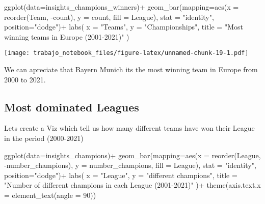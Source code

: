 \documentclass[
]{article}
\newenvironment{Shaded}{\begin{snugshade}}{\end{snugshade}}
\newcommand{\AttributeTok}[1]{\textcolor[rgb]{0.77,0.63,0.00}{#1}}
\newcommand{\DecValTok}[1]{\textcolor[rgb]{0.00,0.00,0.81}{#1}}
\newcommand{\FunctionTok}[1]{\textcolor[rgb]{0.00,0.00,0.00}{#1}}
\newcommand{\NormalTok}[1]{#1}
\newcommand{\SpecialCharTok}[1]{\textcolor[rgb]{0.00,0.00,0.00}{#1}}
\newcommand{\StringTok}[1]{\textcolor[rgb]{0.31,0.60,0.02}{#1}}
\begin{document}
\begin{Shaded}
\begin{Highlighting}[]
\FunctionTok{ggplot}\NormalTok{(}\AttributeTok{data=}\NormalTok{insights\_champions\_winners)}\SpecialCharTok{+}
  \FunctionTok{geom\_bar}\NormalTok{(}\AttributeTok{mapping=}\FunctionTok{aes}\NormalTok{(}\AttributeTok{x =} \FunctionTok{reorder}\NormalTok{(Team, }\SpecialCharTok{{-}}\NormalTok{count), }\AttributeTok{y =}\NormalTok{ count, }\AttributeTok{fill =}\NormalTok{ League), }\AttributeTok{stat =} \StringTok{"identity"}\NormalTok{, }\AttributeTok{position=}\StringTok{"dodge"}\NormalTok{)}\SpecialCharTok{+}
  \FunctionTok{labs}\NormalTok{(}
    \AttributeTok{x =} \StringTok{"Teams"}\NormalTok{,}
    \AttributeTok{y =} \StringTok{"Championships"}\NormalTok{,}
    \AttributeTok{title =} \StringTok{"Most winning teams in Europe (2001{-}2021)"}
\NormalTok{    )}
\end{Highlighting}
\end{Shaded}

\texttt{[image: trabajo\_notebook\_files/figure-latex/unnamed-chunk-19-1.pdf]}

We can apreciate that Bayern Munich its the most winning team in Europe
from 2000 to 2021.

\hypertarget{most-dominated-leagues}{%
\subsection{Most dominated Leagues}\label{most-dominated-leagues}}

Lets create a Viz which tell us how many different teams have won their
League in the period (2000-2021)

\begin{Shaded}
\begin{Highlighting}[]
\FunctionTok{ggplot}\NormalTok{(}\AttributeTok{data=}\NormalTok{insights\_champions)}\SpecialCharTok{+}
  \FunctionTok{geom\_bar}\NormalTok{(}\AttributeTok{mapping=}\FunctionTok{aes}\NormalTok{(}\AttributeTok{x =} \FunctionTok{reorder}\NormalTok{(League, }\SpecialCharTok{{-}}\NormalTok{number\_champions), }\AttributeTok{y =}\NormalTok{ number\_champions, }\AttributeTok{fill =}\NormalTok{ League), }\AttributeTok{stat =} \StringTok{"identity"}\NormalTok{, }\AttributeTok{position=}\StringTok{"dodge"}\NormalTok{)}\SpecialCharTok{+}
  \FunctionTok{labs}\NormalTok{(}
    \AttributeTok{x =} \StringTok{"League"}\NormalTok{,}
    \AttributeTok{y =} \StringTok{"different champions"}\NormalTok{,}
    \AttributeTok{title =} \StringTok{"Number of different champions in each League (2001{-}2021)"}
\NormalTok{  )}\SpecialCharTok{+}
  \FunctionTok{theme}\NormalTok{(}\AttributeTok{axis.text.x =} \FunctionTok{element\_text}\NormalTok{(}\AttributeTok{angle =} \DecValTok{90}\NormalTok{))}
\end{Highlighting}
\end{Shaded}
\end{document}
